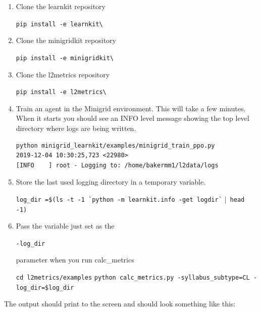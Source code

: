 \begin{enumerate}

\item Clone the learnkit repository\\
\begin{small}
\verb|pip install -e learnkit\|\\[0.1in]
\end{small}

\item Clone the minigridkit repository\\
\begin{small}
\verb|pip install -e minigridkit\|\\[0.1in]
\end{small}

\item Clone the l2metrics repository\\
\begin{small}
\verb|pip install -e l2metrics\|\\[0.1in]
\end{small}

\item Train an agent in the Minigrid environment. This will take a few minutes. When it starts you should see an INFO level message showing the top level directory where logs are being written.\\[0.1in]
\begin{small}
\begin{verbatim}python minigrid_learnkit/examples/minigrid_train_ppo.py
2019-12-04 10:30:25,723 <22980>
[INFO    ] root - Logging to: /home/bakermm1/l2data/logs
\end{verbatim}
\end{small}

\item Store the last used logging directory in a temporary variable.\\
\begin{small}
\verb|log_dir =$(ls -t -1 `python -m learnkit.info -get logdir`| |\verb| head -1)|\\[0.1in]
\end{small}
\item Pass the variable just set as the 
\begin{small}
\verb|-log_dir|
\end{small}parameter when you run calc\_metrics\\
\begin{small}
\verb|cd l2metrics/examples|
\verb|python calc_metrics.py -syllabus_subtype=CL -log_dir=$log_dir|\\[0.2in]
\end{small}
\end{enumerate}
The output should print to the screen and should look something like this:\\[0.2in]

